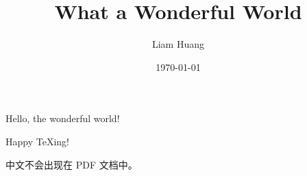 \documentclass{article}
\title{What a Wonderful World}
\author{Liam Huang}
\date{\today}
\begin{document}
\maketitle
Hello, the wonderful world!

Happy \TeX ing!

中文不会出现在 PDF 文档中。
\end{document}
